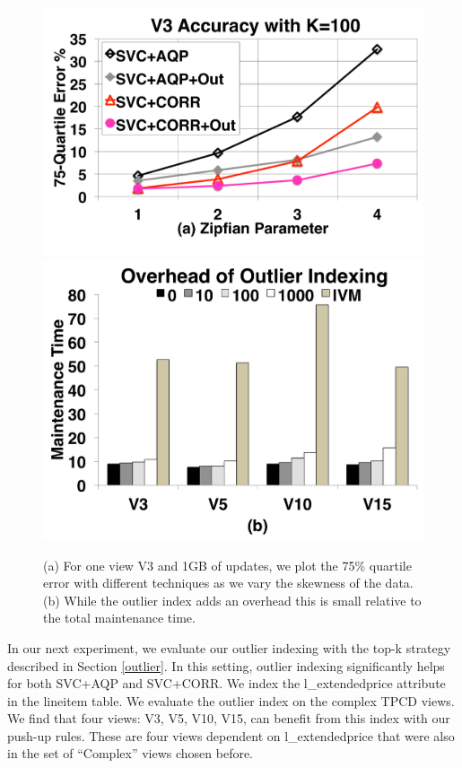 \begin{figure}[t]
\centering
 \includegraphics[scale=0.14]{exp/msoi_2.pdf}
 \includegraphics[scale=0.14]{exp/msoi_1.pdf}\vspace{-1em}
 \caption{(a) For one view V3 and 1GB of updates, we plot the 75\% quartile error with different techniques as we vary the skewness of the data. (b) While the outlier index adds an overhead this is small relative to the total maintenance time.\label{exp5-oi}}
\end{figure}
In our next experiment, we evaluate our outlier indexing with the top-k strategy described in Section \ref{outlier}.
In this setting, outlier indexing significantly helps for both SVC+AQP and SVC+CORR. 
We index the \textsf{l\_extendedprice} attribute in the \textsf{lineitem} table.
We evaluate the outlier index on the complex TPCD views.
We find that four views: V3, V5, V10, V15, can benefit from this index with our push-up rules. 
These are four views dependent on \textsf{l\_extendedprice} that were also in the set of ``Complex'' views chosen before.

